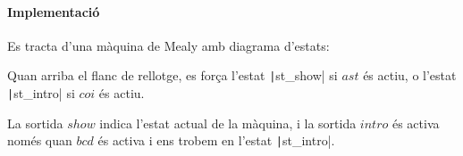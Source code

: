 \paragraph{Implementació}




Es tracta d'una màquina de Mealy amb diagrama d'estats:


Quan arriba el flanc de rellotge, es força l'estat \texttt|st_show| si $ast$ és
actiu, o l'estat \texttt|st_intro| si $coi$ és actiu.

La sortida $show$ indica l'estat actual de la màquina, i la sortida $intro$ és activa
només quan $bcd$ és activa i ens trobem en l'estat \texttt|st_intro|.

\vspace{1cm}

